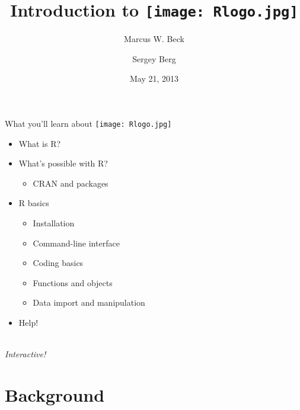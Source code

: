 \documentclass[xcolor=svgnames]{beamer}
\begin{document}

\title[Intro to R]{Introduction to \texttt{[image: Rlogo.jpg]}}
\author[M. Beck and S. Berg]{Marcus W. Beck \and Sergey Berg}


\date{May 21, 2013}


\begin{frame}
\vspace{-0.3in}
\titlepage
\end{frame}

\begin{frame}{What you'll learn about \hspace{0.2em}\texttt{[image: Rlogo.jpg]}}
\begin{itemize}
\itemsep12pt
\item What is R?
\item What's possible with R?
\begin{itemize}
\item CRAN and packages
\end{itemize}
\item R basics
\begin{itemize}
\item Installation
\item Command-line interface
\item Coding basics
\item Functions and objects
\item Data import and manipulation
\end{itemize}
\item Help!\\~\\
\end{itemize}
\pause
\Large
\centerline{\emph{Interactive!}}
\end{frame}


\section{Background}
\end{document}
